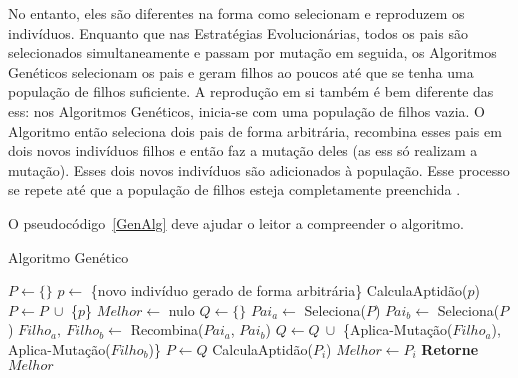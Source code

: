 No entanto, eles são diferentes na forma como selecionam e reproduzem os 
indivíduos. Enquanto que nas Estratégias Evolucionárias, todos os pais são 
selecionados simultaneamente e passam por mutação em seguida, os Algoritmos 
Genéticos selecionam os pais e geram filhos ao poucos até que se tenha uma 
população de filhos suficiente. A reprodução em si também é bem diferente das 
\acp{es}: nos Algoritmos Genéticos, inicia-se com uma população de filhos vazia. 
O Algoritmo então seleciona dois pais de forma arbitrária, recombina esses pais 
em dois novos indivíduos filhos e então faz a mutação deles (as \acp{es} só 
realizam a mutação). Esses dois novos indivíduos são adicionados à população. 
Esse processo se repete até que a população de filhos esteja completamente 
preenchida \citep{Luke2013Metaheuristics}.

O pseudocódigo~\ref{GenAlg} deve ajudar o leitor a compreender o algoritmo.

\begin{algorithm}[h]                      %
	\caption{Algoritmo Genético}          %
	\label{GenAlg}                           %
	\begin{algorithmic}                    %
		\State $P \gets \{\} $
			\State $p \gets$ \{novo indivíduo gerado de forma arbitrária\}
			\State CalculaAptidão($p$)
			\State $P \gets P \ \cup $ \{$p$\} 
		\EndFor
		\State $Melhor \gets$ nulo
		\Repeat
			\State $Q \gets \{\}$
				\State $Pai_{a} \gets $ Seleciona($P$)
				\State $Pai_{b} \gets $ Seleciona($P$)
				\State $Filho_{a},\ Filho_{b} \gets $ Recombina($Pai_{a}$, $Pai_{b}$)
				\State $Q \gets Q\ \cup $ \{Aplica-Mutação($Filho_{a}$), Aplica-Mutação($Filho_{b}$)\}
			\EndFor
			\State $P \gets Q$
				\State CalculaAptidão($P_{i}$)
					\State $Melhor \gets P_{i}$
				\EndIf
			\EndFor
		\State \textbf{Retorne} $Melhor$
		\EndProcedure
	\end{algorithmic}
\end{algorithm}

